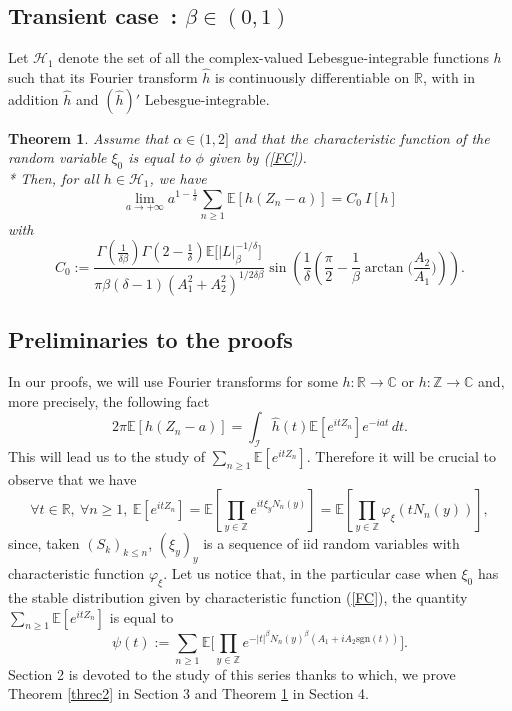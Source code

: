 \documentclass[oneside, a4paper,11pt,reqno]{amsart}
\newtheorem{thm}[hypo]{Theorem}
\begin{document}
\subsection{Transient case~: $\beta\in (0,1)$}   
\noindent Let ${\mathcal H}_1$ denote the set of all the complex-valued Lebesgue-integrable functions $h$ such that its Fourier transform 
$\hat h$ is continuously differentiable on $\mathbb{R}$, with in addition $\hat h$ and $(\hat h)'$ Lebesgue-integrable. 
\begin{thm} \label{threc0}
Assume that $\alpha\in (1,2]$ and that the characteristic function of the random variable $\xi_0$ is equal to $\phi$ given
by (\ref{FC}). \\*
\noindent Then, for all $h\in{\mathcal H}_1$, we have 
$$\lim_{a\rightarrow +\infty}  a^{1-\frac 1 \delta}
    \sum_{n\ge 1}{\mathbb E}[h(Z_n-a)]= C_0\  I[h]$$
with 
$$C_0:= \frac{\Gamma(\frac{1}{\delta\beta})\Gamma(2-\frac{1}{\delta})\mathbb{E} 
\big[|L|_{\beta}^{-1/\delta}\big]}{\pi\beta (\delta-1) (A_1^2 +A_2^2)^{1/2\delta\beta}}
\sin\left(\frac{1}{\delta} \left(\frac{\pi}{2} -\frac{1}{\beta} \arctan 
\Big(\frac{A_2}{A_1}\Big)\right)\right).$$
  

\end{thm}

\subsection{Preliminaries to the proofs}
In our proofs, we will use Fourier transforms for some $h:{\mathbb R}\rightarrow{\mathbb C}$
or $h:{\mathbb Z}\rightarrow{\mathbb C}$ and, more precisely,
the following fact
$$2\pi{\mathbb E}[h(Z_n-a)]=\int_{\mathcal I}\hat h(t) {\mathbb E}[e^{i tZ_n}]e^{-iat}\, dt.$$
This will lead us to the study of
$\sum_{n\ge 1}{\mathbb E}[e^{itZ_n}]$. Therefore it will be crucial to observe that we have
$$\forall t\in{\mathbb R},\ \forall n\ge 1,\ {\mathbb E}[e^{it Z_n}]={\mathbb E}
   \left[\prod_{y\in\mathbb Z}e^{it\xi_yN_n(y)}\right]
    ={\mathbb E}\left[\prod_{y\in\mathbb Z}\varphi_\xi(tN_n(y))\right], $$ 
since, taken $(S_k)_{k\le n}$, $(\xi_y)_y$ is a sequence of iid random variables
with characteristic function $\varphi_\xi$. 
Let us notice that, in the particular case when $\xi_0$ has the stable distribution
given by characteristic function (\ref{FC}), the
quantity $\sum_{n\ge 1}{\mathbb E}[e^{itZ_n}]$ is equal to
$$  \psi(t):=\sum_{n\ge 1}{\mathbb E}\bigg[\prod_{y\in\mathbb Z}
   e^{-|t|^\beta N_n(y)^\beta(A_1+i A_2\text{sgn}(t) )}\bigg].$$
Section 2 is devoted to the study of this series thanks to which, 
we prove Theorem \ref{threc2} in Section 3  and Theorem \ref{threc0} in Section 4.
\end{document}
